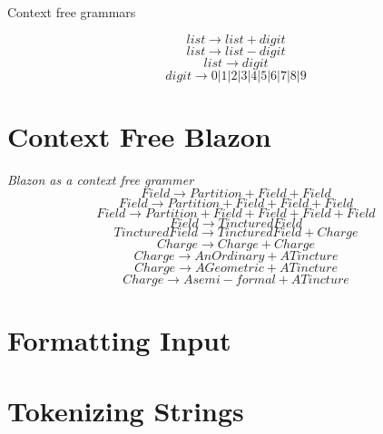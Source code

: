 Context free grammars 

$$ 	list \rightarrow  list + digit  $$
$$	list \to list - digit  $$
$$  list \to digit $$
$$  digit \to 0|1|2|3|4|5|6|7|8|9 $$



\section{Context Free Blazon}



\emph{Blazon as a context free grammer}
$$ 	Field \to  Partition + Field + Field  $$
$$	Field \to  Partition + Field + Field + Field  $$
$$	Field \to  Partition + Field + Field + Field + Field $$
$$  Field \to  Tinctured Field $$
$$  Tinctured Field \to Tinctured Field + Charge $$
$$  Charge \to Charge + Charge $$
$$  Charge \to An Ordinary  + A Tincture $$
$$  Charge \to A Geometric  + A Tincture $$
$$  Charge \to A semi-formal + A Tincture $$


\section{Formatting Input}

\section{Tokenizing Strings} 